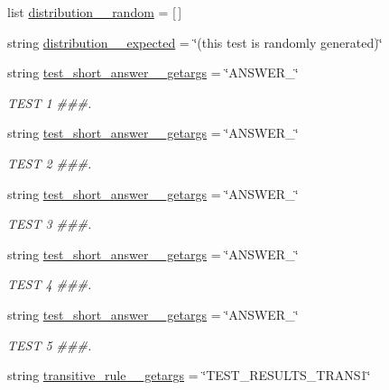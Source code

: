 \begin{DoxyCompactItemize}
list \hyperlink{namespacetests_a47b204c4e788c5641d2766790e212c43}{distribution\+\_\+\_\+random} = \mbox{[}$\,$\mbox{]}
\item 
string \hyperlink{namespacetests_a02c918ab521f2c6887c6a77b04d346b5}{distribution\+\_\+\_\+expected} = \char`\"{}(this test is randomly generated)\char`\"{}
\item 
string \hyperlink{namespacetests_af46119fecedf02ffa994a83ae57872be}{test\+\_\+short\+\_\+answer\+\_\+\_\+getargs} = \char`\"{}A\+N\+S\+W\+E\+R\+\_\char`\"{}
\begin{DoxyCompactList}\small\item\em T\+E\+S\+T 1 \#\#\#. \end{DoxyCompactList}\item 
string \hyperlink{namespacetests_aa934e34b403fe9779aeea9c820d850a9}{test\+\_\+short\+\_\+answer\+\_\+\_\+getargs} = \char`\"{}A\+N\+S\+W\+E\+R\+\_\char`\"{}
\begin{DoxyCompactList}\small\item\em T\+E\+S\+T 2 \#\#\#. \end{DoxyCompactList}\item 
string \hyperlink{namespacetests_a44cb4e3dc58a9be2ee1cec3fdd4bcfd0}{test\+\_\+short\+\_\+answer\+\_\+\_\+getargs} = \char`\"{}A\+N\+S\+W\+E\+R\+\_\char`\"{}
\begin{DoxyCompactList}\small\item\em T\+E\+S\+T 3 \#\#\#. \end{DoxyCompactList}\item 
string \hyperlink{namespacetests_ac9b03b1d61942deb4a9314f1a0eeb4a1}{test\+\_\+short\+\_\+answer\+\_\+\_\+getargs} = \char`\"{}A\+N\+S\+W\+E\+R\+\_\char`\"{}
\begin{DoxyCompactList}\small\item\em T\+E\+S\+T 4 \#\#\#. \end{DoxyCompactList}\item 
string \hyperlink{namespacetests_a958371153d32e9027b1111a801d40f07}{test\+\_\+short\+\_\+answer\+\_\+\_\+getargs} = \char`\"{}A\+N\+S\+W\+E\+R\+\_\char`\"{}
\begin{DoxyCompactList}\small\item\em T\+E\+S\+T 5 \#\#\#. \end{DoxyCompactList}\item 
string \hyperlink{namespacetests_a8e59406dc0d4b23e9fb197f1ab770abf}{transitive\+\_\+rule\+\_\+\_\+getargs} = \char`\"{}T\+E\+S\+T\+\_\+\+R\+E\+S\+U\+L\+T\+S\+\_\+\+T\+R\+A\+N\+S1\char`\"{}

\end{DoxyCompactItemize}
